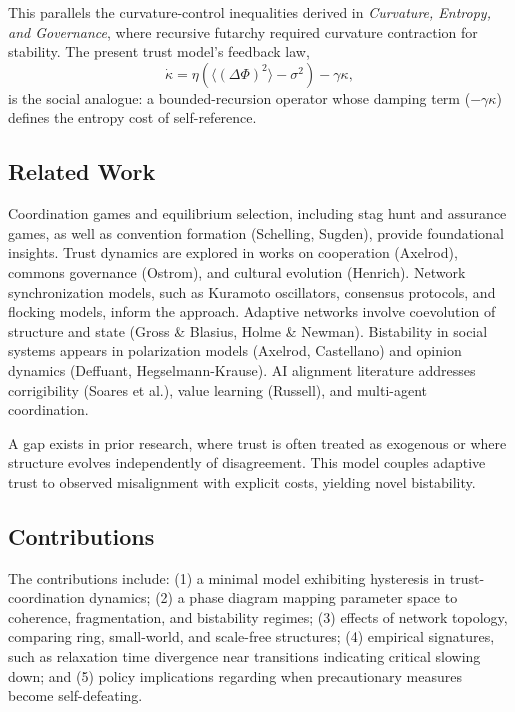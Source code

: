 \documentclass[12pt,a4paper]{article}
\begin{document}
This parallels the curvature-control inequalities derived in \emph{Curvature, Entropy, and Governance}, where recursive futarchy required curvature contraction for stability. The present trust model's feedback law, 
\begin{equation}
\dot{\kappa} = \eta (\langle (\Delta\Phi)^2 \rangle - \sigma^2) - \gamma \kappa,
\label{eq:adaptive_coupling}
\end{equation}
is the social analogue: a bounded-recursion operator whose damping term ($-\gamma \kappa$) defines the entropy cost of self-reference.

\subsection{Related Work}
Coordination games and equilibrium selection, including stag hunt and assurance games, as well as convention formation (Schelling, Sugden), provide foundational insights. Trust dynamics are explored in works on cooperation (Axelrod), commons governance (Ostrom), and cultural evolution (Henrich). Network synchronization models, such as Kuramoto oscillators, consensus protocols, and flocking models, inform the approach. Adaptive networks involve coevolution of structure and state (Gross \& Blasius, Holme \& Newman). Bistability in social systems appears in polarization models (Axelrod, Castellano) and opinion dynamics (Deffuant, Hegselmann-Krause). AI alignment literature addresses corrigibility (Soares et al.), value learning (Russell), and multi-agent coordination.

A gap exists in prior research, where trust is often treated as exogenous or where structure evolves independently of disagreement. This model couples adaptive trust to observed misalignment with explicit costs, yielding novel bistability.

\subsection{Contributions}
The contributions include: (1) a minimal model exhibiting hysteresis in trust-coordination dynamics; (2) a phase diagram mapping parameter space to coherence, fragmentation, and bistability regimes; (3) effects of network topology, comparing ring, small-world, and scale-free structures; (4) empirical signatures, such as relaxation time divergence near transitions indicating critical slowing down; and (5) policy implications regarding when precautionary measures become self-defeating.
\end{document}
